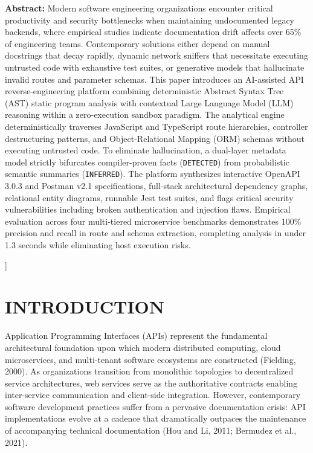 \documentclass[a4paper,10pt]{article}
\begin{document}
  \noindent\hangindent=2cm\fontsize{9pt}{11pt}\selectfont
  \textbf{Abstract:} Modern software engineering organizations encounter critical productivity and security bottlenecks when maintaining undocumented legacy backends, where empirical studies indicate documentation drift affects over 65\% of engineering teams. Contemporary solutions either depend on manual docstrings that decay rapidly, dynamic network sniffers that necessitate executing untrusted code with exhaustive test suites, or generative models that hallucinate invalid routes and parameter schemas. This paper introduces an AI-assisted API reverse-engineering platform combining deterministic Abstract Syntax Tree (AST) static program analysis with contextual Large Language Model (LLM) reasoning within a zero-execution sandbox paradigm. The analytical engine deterministically traverses JavaScript and TypeScript route hierarchies, controller destructuring patterns, and Object-Relational Mapping (ORM) schemas without executing untrusted code. To eliminate hallucination, a dual-layer metadata model strictly bifurcates compiler-proven facts (\texttt{DETECTED}) from probabilistic semantic summaries (\texttt{INFERRED}). The platform synthesizes interactive OpenAPI 3.0.3 and Postman v2.1 specifications, full-stack architectural dependency graphs, relational entity diagrams, runnable Jest test suites, and flags critical security vulnerabilities including broken authentication and injection flaws. Empirical evaluation across four multi-tiered microservice benchmarks demonstrates 100\% precision and recall in route and schema extraction, completing analysis in under 1.3 seconds while eliminating host execution risks.\par
  \vspace{30pt}
]


\section{INTRODUCTION}
\noindent
Application Programming Interfaces (APIs) represent the fundamental architectural foundation upon which modern distributed computing, cloud microservices, and multi-tenant software ecosystems are constructed (Fielding, 2000). As organizations transition from monolithic topologies to decentralized service architectures, web services serve as the authoritative contracts enabling inter-service communication and client-side integration. However, contemporary software development practices suffer from a pervasive documentation crisis: API implementations evolve at a cadence that dramatically outpaces the maintenance of accompanying technical documentation (Hou and Li, 2011; Bermudez et al., 2021).
\end{document}
